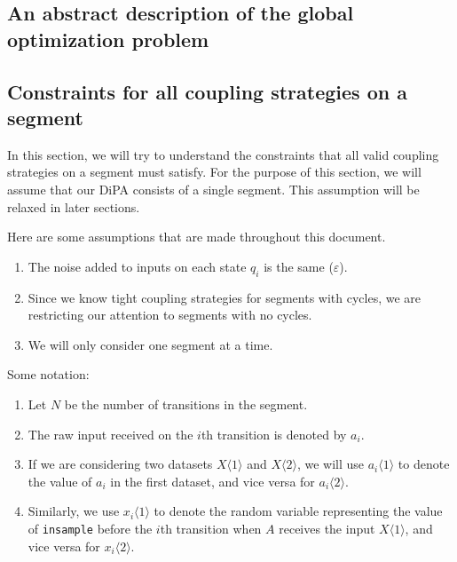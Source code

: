 \documentclass{article}
\renewcommand{\epsilon}{\varepsilon}
\newcommand{\1}{\langle 1 \rangle}
\newcommand{\2}{\langle 2 \rangle}
\begin{document}
\subsection{An abstract description of the global optimization problem}


\newpage

\subsection{Constraints for all coupling strategies on a segment}

In this section, we will try to understand the constraints that all valid coupling strategies on a segment must satisfy. For the purpose of this section, we will assume that our DiPA consists of a single segment. This assumption will be relaxed in later sections. 

Here are some assumptions that are made throughout this document.

\begin{enumerate}
    \item The noise added to inputs on each state $q_i$ is the same ($\epsilon$).
    \item  Since we know tight coupling strategies for segments with cycles, we are restricting our attention to segments with no cycles.
    \item We will only consider one segment at a time.
\end{enumerate}

Some notation:

\begin{enumerate}
    \item Let $N$ be the number of transitions in the segment.
    \item The raw input received on the $i$th transition is denoted by $a_i$.

    \item If we are considering two datasets $X\langle 1 \rangle$ and $X \langle 2 \rangle$, we will use $a_i \langle 1 \rangle$ to denote the value of $a_i$ in the first dataset, and vice versa for $a_i \langle 2 \rangle$.
    
    \item Similarly, we use $x_i \langle 1 \rangle$ to denote the random variable representing the value of \texttt{insample} before the $i$th transition when $A$ receives the input $X\langle 1 \rangle$, and vice versa for $x_i \langle 2 \rangle$.
\end{enumerate}
\end{document}
